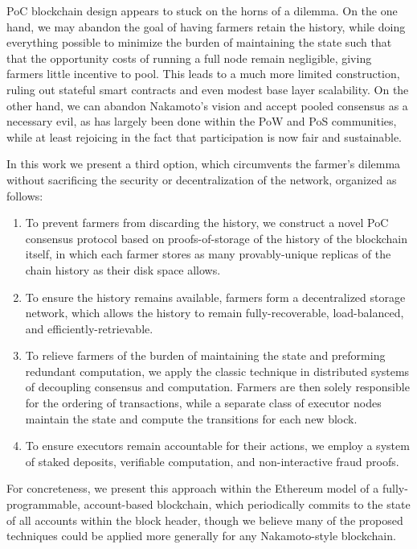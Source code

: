 \documentclass[conference]{IEEEtran}
\begin{document}
PoC blockchain design appears to stuck on the horns of a dilemma. On the one hand, we may abandon the goal of having farmers retain the history, while doing everything possible to minimize the burden of maintaining the state such that that the opportunity costs of running a full node remain negligible, giving farmers little incentive to pool. This leads to a much more limited construction, ruling out stateful smart contracts and even modest base layer scalability. On the other hand, we can abandon Nakamoto’s vision and accept pooled consensus as a necessary evil, as has largely been done within the PoW and PoS communities, while at least rejoicing in the fact that participation is now fair and sustainable. 

In this work we present a third option, which circumvents the farmer’s dilemma without sacrificing the security or decentralization of the network, organized as follows:

\begin{enumerate}
    \item To prevent farmers from discarding the history, we construct a novel PoC consensus protocol based on proofs-of-storage of the history of the blockchain itself, in which each farmer stores as many provably-unique replicas of the chain history as their disk space allows.
    \item To ensure the history remains available, farmers form a decentralized storage network, which allows the history to remain fully-recoverable, load-balanced, and efficiently-retrievable.
    \item To relieve farmers of the burden of maintaining the state and preforming redundant computation, we apply the classic technique in distributed systems of decoupling consensus and computation. Farmers are then solely responsible for the ordering of transactions, while a separate class of executor nodes maintain the state and compute the transitions for each new block.
    \item To ensure executors remain accountable for their actions, we employ a system of staked deposits, verifiable computation, and non-interactive fraud proofs.
\end{enumerate}

For concreteness, we present this approach within the Ethereum model of a fully-programmable, account-based blockchain, which periodically commits to the state of all accounts within the block header, though we believe many of the proposed techniques could be applied more generally for any Nakamoto-style blockchain. 
\end{document}
